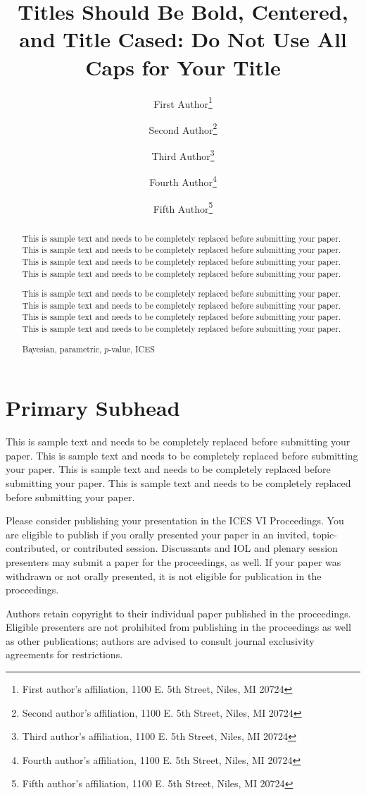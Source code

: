 \documentclass[11pt]{asaproc}
\title{ Titles Should Be Bold, Centered, and Title Cased: Do Not
Use All Caps for Your Title}
\author{First Author\thanks{First author's affiliation, 1100 E. 5th Street, Niles, MI 20724} \and  Second Author\thanks{Second author's affiliation, 1100 E. 5th Street, Niles, MI 20724} \and  Third Author\thanks{Third author's affiliation,  1100 E. 5th Street, Niles, MI 20724} \and Fourth Author\thanks{Fourth author's affiliation,  1100 E. 5th Street, Niles, MI 20724} \and Fifth Author\thanks{Fifth author's affiliation,  1100 E. 5th Street, Niles, MI 20724}}
\begin{document}
\maketitle

\begin{abstract}
This is sample text and needs to be completely replaced before submitting your paper. This is sample text and needs to be completely replaced before submitting your paper. This is sample text and needs to be completely replaced before submitting your paper. This is sample text and needs to be completely replaced before submitting your paper.

This is sample text and needs to be completely replaced before submitting your paper. This is sample text and needs to be completely replaced before submitting your paper.  This is sample text and needs to be completely replaced before submitting your paper. This is sample text and needs to be completely replaced before submitting your paper.
\begin{keywords}
Bayesian, parametric, $p$-value, ICES
\end{keywords}
\end{abstract}



\section{Primary Subhead\label{intro}}

This is sample text and needs to be completely replaced before submitting your paper. This is sample text and needs to be completely replaced before submitting your paper. This is sample text and needs to be completely replaced before submitting your paper. This is sample text and needs to be completely replaced before submitting your paper.

Please consider publishing your presentation in the ICES VI Proceedings. You are eligible to publish if you orally presented your paper in an invited, topic-contributed, or contributed session. Discussants and IOL and plenary session presenters may submit a paper for the proceedings, as well. If your paper was withdrawn or not orally presented, it is not eligible for publication in the proceedings.

Authors retain copyright to their individual paper published in the proceedings. Eligible presenters are not prohibited from publishing in the proceedings as well as other publications; authors are advised to consult journal exclusivity agreements for restrictions.
\end{document}
